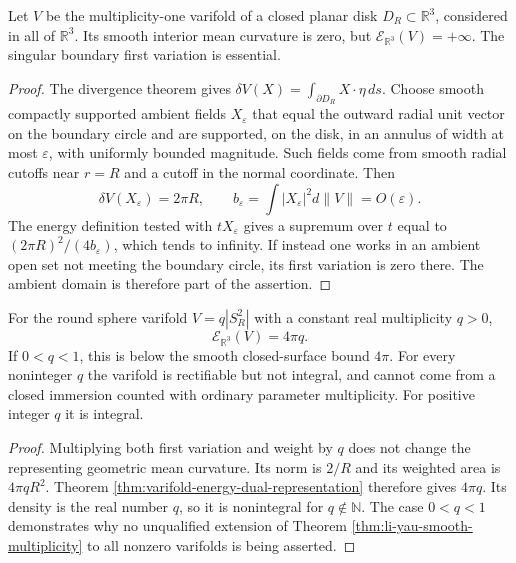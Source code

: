 \begin{example}\label{ex:disk-singular-first-variation-energy}
Let $V$ be the multiplicity-one varifold of a closed planar disk $D_R\subset\mathbb R^3$, considered in all of $\mathbb R^3$. Its smooth interior mean curvature is zero, but $\mathcal E_{\mathbb R^3}(V)=+\infty$. The singular boundary first variation is essential.
\end{example}
\begin{proof}
The divergence theorem gives $\delta V(X)=\int_{\partial D_R}X\cdot\eta\,ds$. Choose smooth compactly supported ambient fields $X_\varepsilon$ that equal the outward radial unit vector on the boundary circle and are supported, on the disk, in an annulus of width at most $\varepsilon$, with uniformly bounded magnitude. Such fields come from smooth radial cutoffs near $r=R$ and a cutoff in the normal coordinate. Then
\[
 \delta V(X_\varepsilon)=2\pi R,\qquad
 b_\varepsilon=\int|X_\varepsilon|^2d\|V\|=O(\varepsilon).
\]
The energy definition tested with $tX_\varepsilon$ gives a supremum over $t$ equal to $(2\pi R)^2/(4b_\varepsilon)$, which tends to infinity. If instead one works in an ambient open set not meeting the boundary circle, its first variation is zero there. The ambient domain is therefore part of the assertion.
\end{proof}

\begin{example}\label{ex:willmore-noninteger-sphere}
For the round sphere varifold $V=q|S_R^2|$ with a constant real multiplicity $q>0$,
\[
 \mathcal E_{\mathbb R^3}(V)=4\pi q.
\]
If $0<q<1$, this is below the smooth closed-surface bound $4\pi$. For every noninteger $q$ the varifold is rectifiable but not integral, and cannot come from a closed immersion counted with ordinary parameter multiplicity. For positive integer $q$ it is integral.
\end{example}
\begin{proof}
Multiplying both first variation and weight by $q$ does not change the representing geometric mean curvature. Its norm is $2/R$ and its weighted area is $4\pi qR^2$. Theorem \ref{thm:varifold-energy-dual-representation} therefore gives $4\pi q$. Its density is the real number $q$, so it is nonintegral for $q\notin\mathbb N$. The case $0<q<1$ demonstrates why no unqualified extension of Theorem \ref{thm:li-yau-smooth-multiplicity} to all nonzero varifolds is being asserted.
\end{proof}
